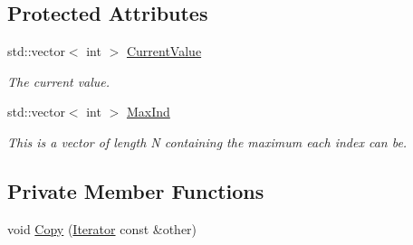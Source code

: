 \subsection*{Protected Attributes}
\begin{DoxyCompactItemize}
\item 
std::vector$<$ int $>$ \hyperlink{classJKBuilder_1_1Iterator_a20ca24f6d827aba144bb087c4bcb74a0}{CurrentValue}
\begin{DoxyCompactList}\small\item\em The current value. \item\end{DoxyCompactList}\item 
std::vector$<$ int $>$ \hyperlink{classJKBuilder_1_1Iterator_ab6b56d3c4e9353bc938dd6249cde9ca0}{MaxInd}
\begin{DoxyCompactList}\small\item\em This is a vector of length N containing the maximum each index can be. \item\end{DoxyCompactList}\end{DoxyCompactItemize}
\subsection*{Private Member Functions}
\begin{DoxyCompactItemize}
\item 
void \hyperlink{classJKBuilder_1_1Iterator_aacb7559eb1b8aab6e7bb6a56602d97ff}{Copy} (\hyperlink{classJKBuilder_1_1Iterator}{Iterator} const \&other)
\end{DoxyCompactItemize}


